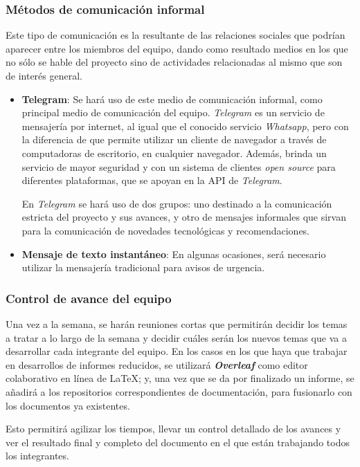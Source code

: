 \subsubsection{Métodos de comunicación informal}
Este tipo de comunicación es la resultante de las relaciones sociales que podrían aparecer entre los miembros del equipo, dando como resultado medios en los que no sólo se hable del proyecto sino de actividades relacionadas al mismo que son de interés general.
	\begin{itemize}
	\item{\textbf{Telegram}:}
	Se hará uso de este medio de comunicación informal, como principal medio de comunicación del equipo.
    \textit{Telegram} es un servicio de mensajería por internet, al igual que el conocido servicio \textit{Whatsapp}, pero con la diferencia de que permite utilizar un cliente de navegador a través de computadoras de escritorio, en cualquier navegador.
    Además, brinda un servicio de mayor seguridad y con un sistema de clientes \textit{open source} para diferentes plataformas, que se apoyan en la API de \textit{Telegram}.
    
    En \textit{Telegram} se hará uso de dos grupos: uno destinado a la comunicación estricta del proyecto y sus avances, y otro de mensajes informales que sirvan para la comunicación de novedades tecnológicas y recomendaciones.
    
	\item{\textbf{Mensaje de texto instantáneo}:}
    En algunas ocasiones, será necesario utilizar la mensajería tradicional para avisos de urgencia.
	\end{itemize}


\subsubsection{Control de avance del equipo}
Una vez a la semana, se harán reuniones cortas que permitirán decidir los temas a tratar a lo largo de la semana y decidir cuáles serán los nuevos temas que va a desarrollar cada integrante del equipo.
En los casos en los que haya que trabajar en desarrollos de informes reducidos, se utilizará \textbf{\textit{Overleaf}} como editor colaborativo en línea de \LaTeX; y, una vez que se da por finalizado un informe, se añadirá a los repositorios correspondientes de documentación, para fusionarlo con los documentos ya existentes.

Esto permitirá agilizar los tiempos, llevar un control detallado de los avances y ver el resultado final y completo del documento en el que están trabajando todos los integrantes.

